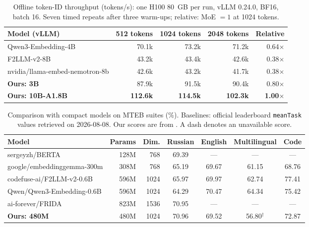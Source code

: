 \documentclass[11pt]{article}
\begin{document}
\begin{table}[!t]
  \caption{Offline token-ID throughput (tokens/s): one H100 80~GB per run, vLLM 0.24.0, BF16, batch 16. Seven timed repeats after three warm-ups; relative: MoE $=1$ at 1024 tokens.}
  \label{tab:throughput}
  \centering
  \small
  \setlength{\tabcolsep}{5pt}
  \begin{tabular}{p{8.0cm}rrrr}
    \toprule
    \textbf{Model (vLLM)} & \textbf{512 tokens} & \textbf{1024 tokens} & \textbf{2048 tokens} & \textbf{Relative} \\
    \midrule
    Qwen3-Embedding-4B
      & 70.1k & 73.2k & 71.2k & 0.64$\times$ \\
    F2LLM-v2-8B
      & 43.2k & 43.4k & 42.6k & 0.38$\times$ \\
    nvidia/llama-embed-nemotron-8b
      & 42.6k & 43.2k & 41.7k & 0.38$\times$ \\
    \midrule
    \textbf{Ours: 3B}
      & 87.9k & 91.5k & 90.4k & 0.80$\times$ \\
    \textbf{Ours: 10B-A1.8B}
      & \textbf{112.6k} & \textbf{114.5k} & \textbf{102.3k} & \textbf{1.00$\times$} \\
    \bottomrule
  \end{tabular}
\end{table}

\begin{table}[!t]
  \caption{Comparison with compact models on MTEB suites (\%). Baselines: official leaderboard \texttt{meanTask} values retrieved on 2026-08-08. Our scores are from . A dash denotes an unavailable score.}
  \label{tab:baselines}
  \centering
  \small
  \setlength{\tabcolsep}{5pt}
  \begin{tabular}{lrrcccc}
    \toprule
    \textbf{Model} & \textbf{Params} & \textbf{Dim.} & \textbf{Russian} & \textbf{English} & \textbf{Multilingual} & \textbf{Code} \\
    \midrule
    sergeyzh/BERTA                              & 128M & 768  & 69.39 & --- & --- & --- \\
    google/embeddinggemma-300m                  & 308M & 768  & 65.19 & 69.67 & 61.15 & 68.76 \\
    codefuse-ai/F2LLM-v2-0.6B                   & 596M & 1024 & 65.97 & 69.97 & 62.74 & 77.41 \\
    Qwen/Qwen3-Embedding-0.6B                   & 596M & 1024 & 64.29 & 70.47 & 64.34 & 75.42 \\
    ai-forever/FRIDA                            & 823M & 1536 & 70.95 & --- & --- & --- \\
    \midrule
    \textbf{Ours: 480M}                         & 480M & 1024 & 70.96 & 69.52 & 56.80$^{\dagger}$ & 72.87 \\
    \bottomrule
  \end{tabular}
\end{table}
\end{document}
